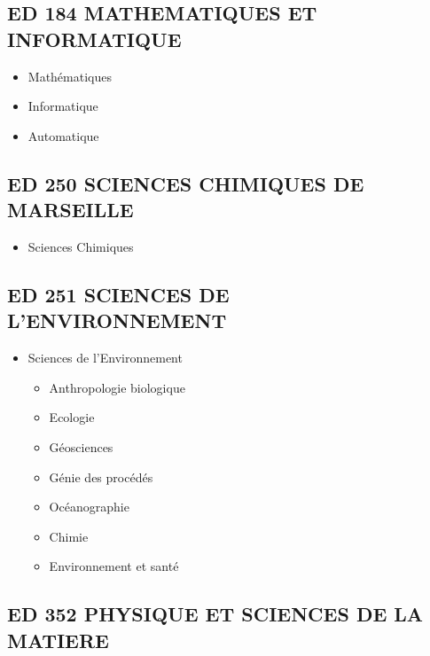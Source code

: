 	\subsection*{ED 184 MATHEMATIQUES ET INFORMATIQUE}\label{ed-184-mathematiques-et-informatique}

		\begin{itemize}
		\item Mathématiques
		\item Informatique
		\item Automatique
		\end{itemize}

	\subsection*{ED 250 SCIENCES CHIMIQUES DE MARSEILLE}\label{ed-250-sciences-chimiques-de-marseille}

		\begin{itemize}
		\item Sciences Chimiques
		\end{itemize}

	\subsection*{ED 251 SCIENCES DE L'ENVIRONNEMENT}\label{ed-251-sciences-de-lenvironnement}

		\begin{itemize}
		\item Sciences de l'Environnement
			\begin{itemize}
			\item Anthropologie biologique
			\item Ecologie
			\item Géosciences 
			\item Génie des procédés
			\item Océanographie
			\item Chimie 
			\item Environnement et santé 
			\end{itemize}
		\end{itemize}

	\subsection*{ED 352 PHYSIQUE ET SCIENCES DE LA MATIERE}\label{ed-352-physique-et-sciences-de-la-matiere}

